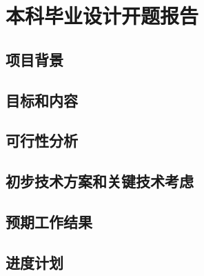 \thispagestyle{empty}
{
\chapter{本科毕业设计开题报告}

\section{项目背景}

\section{目标和内容}

\section{可行性分析}

\section{初步技术方案和关键技术考虑}

\section{预期工作结果}

\section{进度计划} 
}